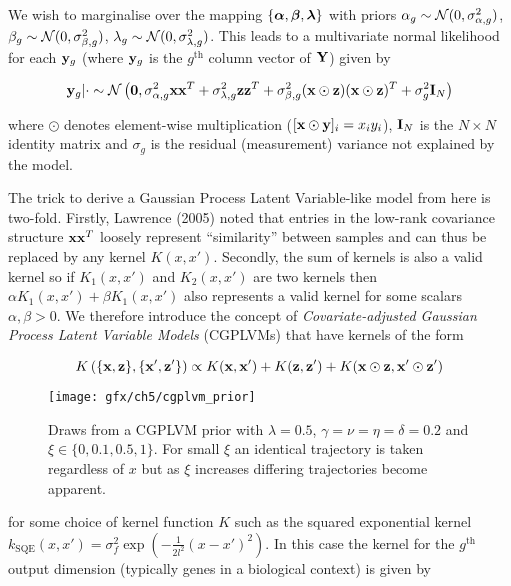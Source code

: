 We wish to marginalise over the mapping $\{\bm{\alpha}, \bm{\beta}, \bm{\lambda}\}$ with priors
$\alpha_g \sim \mathcal{N}(0, \sigma^2_{\alpha,g})$,
$\beta_g \sim \mathcal{N}(0, \sigma^2_{\beta,g})$,
$\lambda_g \sim \mathcal{N}(0, \sigma^2_{\lambda,g})$.
This leads to a multivariate normal likelihood for each $\mathbf{y}_g$  (where $\mathbf{y}_g$ is the $g^{\text{th}}$
column vector of $\mathbf{Y}$) given by

\begin{equation}
  \mathbf{y}_g | \cdot \sim
  \mathcal{N}\left(\bm{0}, \sigma_{\alpha,g}^2 \mathbf{x} \mathbf{x}^T + \sigma_{\lambda,g}^2 \mathbf{z} \mathbf{z}^T +
  \sigma_{\beta,g}^2 (\mathbf{x} \odot \mathbf{z})(\mathbf{x} \odot \mathbf{z})^T + \sigma_g^2 \mathbf{I}_N
  \right)
\end{equation}

where $\odot$ denotes element-wise multiplication ($[\mathbf{x} \odot \mathbf{y}]_i = x_i y_i$), $\mathbf{I}_N$ is the $N \times N$ identity matrix and $\sigma_g$ is the residual (measurement) variance not explained by the model.

The trick to derive a Gaussian Process Latent Variable-like model from here is two-fold. Firstly, Lawrence (2005) \cite{Lawrence2005-cu} noted that entries in the low-rank covariance structure $\mathbf{x} \mathbf{x}^T$ loosely represent ``similarity'' between samples and can thus be replaced by any kernel $K(x,x')$. Secondly, the sum of kernels is also a valid kernel so if $K_1(x,x')$ and $K_2(x,x')$ are two kernels then  $\alpha K_1(x,x') + \beta K_1(x,x')$ also represents a valid kernel for some scalars $\alpha, \beta > 0$. We therefore introduce the concept of \emph{Covariate-adjusted Gaussian Process Latent Variable Models} (CGPLVMs) that have kernels of the form

\begin{equation} \label{eq:clvm_kernel}
K\left( \{\mathbf{x}, \mathbf{z}\}, \{\mathbf{x}', \mathbf{z}'\} \right) \propto K(\mathbf{x}, \mathbf{x}') + K(\mathbf{z}, \mathbf{z}') +
K(\mathbf{x} \odot \mathbf{z},\mathbf{x}' \odot \mathbf{z}')
\end{equation}

\begin{figure}
  \centering
\texttt{[image: gfx/ch5/cgplvm\_prior]}
\caption{Draws from a CGPLVM prior with $\lambda = 0.5$, $\gamma = \nu = \eta = \delta = 0.2$ and $\xi \in \{0, 0.1, 0.5, 1\}$. For small $\xi$ an identical trajectory is taken regardless of $x$ but as $\xi$ increases differing trajectories become apparent.} \label{fig:cgplvm_prior}
\end{figure}


for some choice of kernel function $K$ such as the squared exponential kernel $k_{\text{SQE}}(x, x') = \sigma_f^2 \exp\left(-\frac{1}{2l^2}(x - x')^2\right)$. In this case the kernel for the $g^{\text{th}}$ output dimension (typically genes in a biological context) is given by

